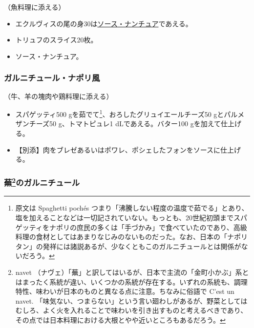\begin{recette}
（魚料理に添える）

\begin{itemize}
\item
  エクルヴィスの尾の身30は\protect\hyperlink{sauce-nantua}{ソース・ナンチュア}であえる。
\item
  トリュフのスライス20枚。
\item
  ソース・ナンチュア。
\end{itemize}

\atoaki{}

\hypertarget{garniture-napolitaine}{%
\subsubsection{ガルニチュール・ナポリ風}\label{garniture-napolitaine}}



（牛、羊の塊肉や鶏料理に添える）

\begin{itemize}
\item
  スパゲッティ500 gを茹でて\footnote{原文は Spaghetti pochés
    つまり「沸騰しない程度の温度で茹でる」とあり、塩を加えることなどは一切記されていない。もっとも、20世紀初頭までスパゲッティをナポリの庶民の多くは「手づかみ」で食べていたのであり、高級料理の食材としてはあまりなじみのないものだった。なお、日本の「ナポリタン」の発祥には諸説あるが、少なくともこのガルニチュールとは関係がないだろう。}、おろしたグリュイエールチーズ50
  gとパルメザンチーズ50 g、トマトピュレ1 dLであえる。バター100
  gを加えて仕上げる。
\item
  【別添】肉をブレゼあるいはポワレ、ポシェしたフォンをソースに仕上げる。
\end{itemize}

\atoaki{}

\hypertarget{garniture-aux-navets}{%
\subsubsection[蕪のガルニチュール]{\texorpdfstring{蕪\footnote{navet
  （ナヴェ）「蕪」と訳してはいるが、日本で主流の「金町小かぶ」系とはまったく系統が違い、いくつかの系統が存在する。いずれの系統も、調理特性、味わいが日本のものと異なる点に注意。ちなみに俗語で
  C'est un navet.
  「味気ない、つまらない」という言い廻わしがあるが、野菜としてはむしろ、よく火を入れることで味わいを引き出すものと考えるべきであり、その点では日本料理における大根とやや近いところもあるだろう。}のガルニチュール}{蕪のガルニチュール}}\label{garniture-aux-navets}}


\end{recette}
